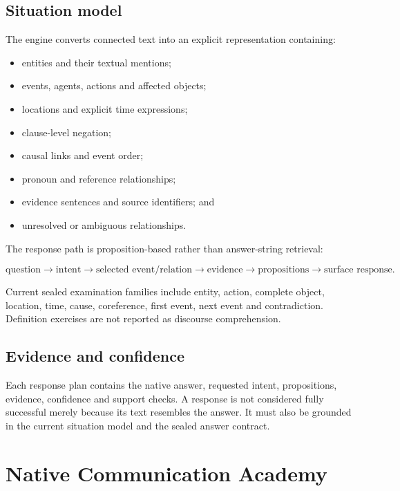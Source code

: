 \documentclass[11pt,a4paper]{article}
\begin{document}
\subsection{Situation model}

The engine converts connected text into an explicit representation containing:

\begin{itemize}
  \item entities and their textual mentions;
  \item events, agents, actions and affected objects;
  \item locations and explicit time expressions;
  \item clause-level negation;
  \item causal links and event order;
  \item pronoun and reference relationships;
  \item evidence sentences and source identifiers; and
  \item unresolved or ambiguous relationships.
\end{itemize}

The response path is proposition-based rather than answer-string retrieval:

\[
\text{question}
\rightarrow \text{intent}
\rightarrow \text{selected event/relation}
\rightarrow \text{evidence}
\rightarrow \text{propositions}
\rightarrow \text{surface response}.
\]

Current sealed examination families include entity, action, complete object, location, time,
cause, coreference, first event, next event and contradiction.  Definition exercises are not
reported as discourse comprehension.

\subsection{Evidence and confidence}

Each response plan contains the native answer, requested intent, propositions, evidence,
confidence and support checks.  A response is not considered fully successful merely because
its text resembles the answer.  It must also be grounded in the current situation model and the
sealed answer contract.

\section{Native Communication Academy}
\end{document}

